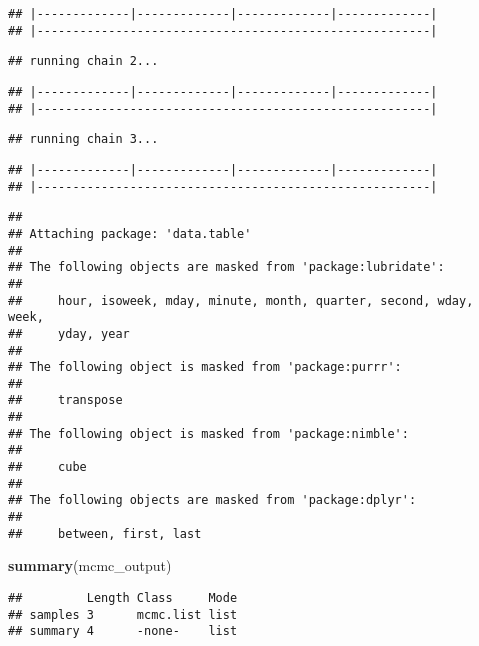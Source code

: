 \documentclass[
]{article}
\newenvironment{Shaded}{\begin{snugshade}}{\end{snugshade}}
\newcommand{\CommentTok}[1]{\textcolor[rgb]{0.56,0.35,0.01}{\textit{#1}}}
\newcommand{\FunctionTok}[1]{\textcolor[rgb]{0.13,0.29,0.53}{\textbf{#1}}}
\newcommand{\NormalTok}[1]{#1}
\newcommand{\SpecialCharTok}[1]{\textcolor[rgb]{0.81,0.36,0.00}{\textbf{#1}}}
\begin{document}
\begin{verbatim}
## |-------------|-------------|-------------|-------------|
## |-------------------------------------------------------|
\end{verbatim}

\begin{verbatim}
## running chain 2...
\end{verbatim}

\begin{verbatim}
## |-------------|-------------|-------------|-------------|
## |-------------------------------------------------------|
\end{verbatim}

\begin{verbatim}
## running chain 3...
\end{verbatim}

\begin{verbatim}
## |-------------|-------------|-------------|-------------|
## |-------------------------------------------------------|
\end{verbatim}

\begin{Shaded}
\end{Shaded}

\begin{verbatim}
## 
## Attaching package: 'data.table'
## 
## The following objects are masked from 'package:lubridate':
## 
##     hour, isoweek, mday, minute, month, quarter, second, wday, week,
##     yday, year
## 
## The following object is masked from 'package:purrr':
## 
##     transpose
## 
## The following object is masked from 'package:nimble':
## 
##     cube
## 
## The following objects are masked from 'package:dplyr':
## 
##     between, first, last
\end{verbatim}

\begin{Shaded}
\begin{Highlighting}[]
\FunctionTok{summary}\NormalTok{(mcmc\_output)}
\end{Highlighting}
\end{Shaded}

\begin{verbatim}
##         Length Class     Mode
## samples 3      mcmc.list list
## summary 4      -none-    list
\end{verbatim}
\end{document}

